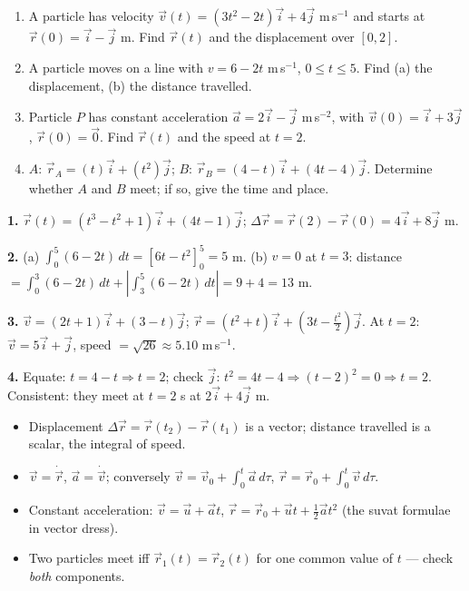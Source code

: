 \documentclass[11pt]{article}
\begin{document}
\begin{exercice}[Consolidation]
\begin{enumerate}
\item A particle has velocity $\vec{v}(t) = (3t^{2} - 2t)\vec{i} + 4\vec{j}$ m\,s$^{-1}$ and starts at $\vec{r}(0) = \vec{i} - \vec{j}$ m. Find $\vec{r}(t)$ and the displacement over $[0, 2]$.
\item A particle moves on a line with $v = 6 - 2t$ m\,s$^{-1}$, $0 \le t \le 5$. Find (a) the displacement, (b) the distance travelled.
\item Particle $P$ has constant acceleration $\vec{a} = 2\vec{i} - \vec{j}$ m\,s$^{-2}$, with $\vec{v}(0) = \vec{i} + 3\vec{j}$, $\vec{r}(0) = \vec{0}$. Find $\vec{r}(t)$ and the speed at $t = 2$.
\item $A$: $\vec{r}_A = (t)\vec{i} + (t^{2})\vec{j}$; $B$: $\vec{r}_B = (4 - t)\vec{i} + (4t - 4)\vec{j}$. Determine whether $A$ and $B$ meet; if so, give the time and place.
\end{enumerate}
\end{exercice}

\begin{corrige}[Exercise 1]
\textbf{1.} $\vec{r}(t) = (t^{3} - t^{2} + 1)\vec{i} + (4t - 1)\vec{j}$; $\Delta\vec{r} = \vec{r}(2) - \vec{r}(0) = 4\vec{i} + 8\vec{j}$ m.

\textbf{2.} (a) $\displaystyle\int_{0}^{5} (6-2t)\,dt = \left[6t - t^{2}\right]_{0}^{5} = 5$ m. (b) $v = 0$ at $t = 3$: distance $= \displaystyle\int_{0}^{3} (6-2t)\,dt + \left|\int_{3}^{5} (6-2t)\,dt\right| = 9 + 4 = 13$ m.

\textbf{3.} $\vec{v} = (2t+1)\vec{i} + (3 - t)\vec{j}$; $\vec{r} = (t^{2} + t)\vec{i} + \left(3t - \tfrac{t^{2}}{2}\right)\vec{j}$. At $t = 2$: $\vec{v} = 5\vec{i} + \vec{j}$, speed $= \sqrt{26} \approx 5.10$ m\,s$^{-1}$.

\textbf{4.} Equate: $t = 4 - t \Rightarrow t = 2$; check $\vec{j}$: $t^{2} = 4t - 4 \Rightarrow (t-2)^{2} = 0 \Rightarrow t = 2$. Consistent: they meet at $t = 2$ s at $2\vec{i} + 4\vec{j}$ m.
\end{corrige}

\begin{aretenir}
\begin{itemize}
\item Displacement $\Delta\vec{r} = \vec{r}(t_2) - \vec{r}(t_1)$ is a vector; distance travelled is a scalar, the integral of speed.
\item $\vec{v} = \dot{\vec{r}}$, $\vec{a} = \dot{\vec{v}}$; conversely $\vec{v} = \vec{v}_0 + \displaystyle\int_{0}^{t} \vec{a}\,d\tau$, $\vec{r} = \vec{r}_0 + \displaystyle\int_{0}^{t} \vec{v}\,d\tau$.
\item Constant acceleration: $\vec{v} = \vec{u} + \vec{a}t$, $\vec{r} = \vec{r}_0 + \vec{u}t + \tfrac12 \vec{a}t^{2}$ (the suvat formulae in vector dress).
\item Two particles meet iff $\vec{r}_1(t) = \vec{r}_2(t)$ for one common value of $t$ --- check \emph{both} components.
\end{itemize}
\end{aretenir}
\end{document}
